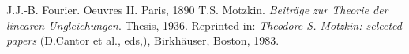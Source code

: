 \documentclass[12pt, a4paper]{article}
\begin{document}
\begin{scriptsize}
\begin{ttfamily}

\end{ttfamily}
\end{scriptsize}

\begin{thebibliography}{9}
 J.J.-B. Fourier. Oeuvres II. Paris, 1890
 T.S. Motzkin. {\em Beitr\"{a}ge zur Theorie der linearen Ungleichungen}. Thesis, 1936. Reprinted in: {\em Theodore S. Motzkin: selected papers} (D.Cantor et al., eds,), Birkh\"{a}user, Boston, 1983.
\end{thebibliography}
\end{document}
